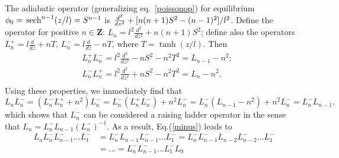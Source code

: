 \documentclass{jpp}
\def\sech{{\,\rm sech}}
\begin{document}
The adiabatic operator (generalizing eq.\ \ref{poissonop}) for equilibrium
$\phi_0=\sech^{n-1}(z/l)=S^{n-1}$ is
${d^2\over dz^2}+[n(n+1)S^2-(n-1)^2]/l^2$. Define the operator
for positive $n\in \mathbf{Z}$:
$L_n=l^2\frac{d^2}{dz^2}+{n(n+1)} S^2$; define also the operators
$L^+_n=l\frac{d}{dz}+n T$, $L^-_n=l\frac{d}{dz}-n T$, where
$T=\tanh(z/l)$. Then
\begin{equation}
\begin{split}
  &L^+_n L^-_n=l^2\frac{d^2}{dz^2}-n S^2-n^2 T^2
  =L_{n-1}-n^2;\\
  &L^-_n L^+_n=l^2\frac{d^2}{dz^2}+n S^2-n^2 T^2
  =L_n-n^2.\\
\end{split}
\end{equation}
Using these properties, we immediately find that
   \begin{equation}
     L_n L^-_n=(L^-_n L^+_n+n^2)L^-_n=L^-_n (L^+_n
     L^-_n)+n^2L^-_n=L^-_n (L_{n-1}-n^2)+n^2 L^-_n=L^-_n L_{n-1},
     \label{minus}
   \end{equation}
which shows that $L^-_n$ can be considered a raising ladder operator
in the sense that $L_n=L^-_nL_{n-1}(L^-_n)^{-1}$.   
As a result, Eq.(\ref{minus}) leads to
\begin{equation}
  \begin{split}
  L_n L_n ^- L_{n-1}^- ... L_1^-&=L^-_n L_{n-1}L_{n-1}^-
  ... L_1^-=L^-_n L_{n-1}^- L_{n-2}L_{n-2}^- ... L_1^-\\
  & = ...= L_n ^-L_{n-1}^- ... L_1^- L_0
  \end{split}
  \label{nu}
\end{equation}
\end{document}
